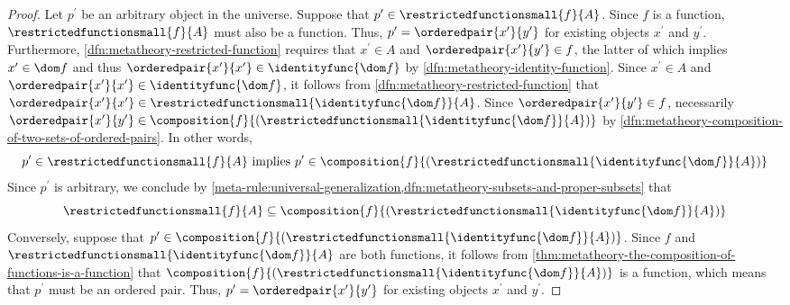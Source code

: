 \begin{proof}
    Let \( p^{\prime} \) be an arbitrary object in the universe.
    Suppose that \( p^{\prime} \in \restrictedfunctionsmall{f}{A} \).
    Since \( f \) is a function, \( \restrictedfunctionsmall{f}{A} \) must also be a function.
    Thus, \( p^{\prime} = \orderedpair{x^{\prime}}{y^{\prime}} \) for existing objects \( x^{\prime} \) and \( y^{\prime} \).
    Furthermore, \cref{dfn:metatheory-restricted-function} requires that \( x^{\prime} \in A \) and \( \orderedpair{x^{\prime}}{y^{\prime}} \in f \),
    the latter of which implies \( x^{\prime} \in \dom f \) and thus \( \orderedpair{x^{\prime}}{x^{\prime}} \in \identityfunc{\dom f} \)
    by \cref{dfn:metatheory-identity-function}.
    Since \( x^{\prime} \in A \) and \( \orderedpair{x^{\prime}}{x^{\prime}} \in \identityfunc{ \dom f } \), it follows from
    \cref{dfn:metatheory-restricted-function}
    that \( \orderedpair{x^{\prime}}{x^{\prime}} \in \restrictedfunctionsmall{ \identityfunc{\dom f} }{A} \).
    Since \( \orderedpair{x^{\prime}}{y^{\prime}} \in f \),
    necessarily \( \orderedpair{x^{\prime}}{y^{\prime}} \in \composition{ f }{ \mleft( \restrictedfunctionsmall{ \identityfunc{\dom f} }{A} \mright) } \)
    by \cref{dfn:metatheory-composition-of-two-sets-of-ordered-pairs}.
    In other words,
    \begin{equation*}
        p^{\prime} \in \restrictedfunctionsmall{f}{A} \ \text{implies} \ p^{\prime} \in \composition{ f }{ \mleft(  \restrictedfunctionsmall{ \identityfunc{\dom f} }{A} \mright) }
    \end{equation*}
    Since \( p^{\prime} \) is arbitrary, we conclude by \cref{meta-rule:universal-generalization,dfn:metatheory-subsets-and-proper-subsets} that
    \begin{equation*}
         \restrictedfunctionsmall{f}{A} \subseteq \composition{ f }{ \mleft( \restrictedfunctionsmall{ \identityfunc{\dom f} }{A} \mright) }
    \end{equation*}
    Conversely, suppose that \( p^{\prime} \in \composition{f}{\mleft( \restrictedfunctionsmall{ \identityfunc{\dom f} }{A} \mright) } \).
    Since \( f \) and \( \restrictedfunctionsmall{ \identityfunc{ \dom f } }{A} \) are both functions, it follows from
    \cref{thm:metatheory-the-composition-of-functions-is-a-function} that
    \( \composition{f}{\mleft( \restrictedfunctionsmall{ \identityfunc{\dom f} }{A} \mright) } \)
    is a function, which means that \( p^{\prime} \) must be an ordered pair.
    Thus, \( p^{\prime} = \orderedpair{x^{\prime}}{y^{\prime}} \) for existing objects \( x^{\prime} \) and \( y^{\prime} \).

\end{proof}
